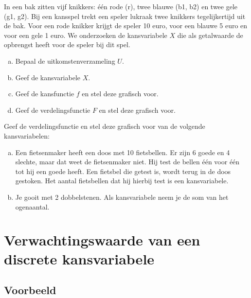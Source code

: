 \documentclass[a4paper,12pt, twoside]{article}
\begin{document}
\begin{oefening}
In een bak zitten vijf knikkers: één rode (r), twee blauwe (b1, b2) en twee gele (g1, g2). Bij een kansspel trekt een speler lukraak twee knikkers tegelijkertijd uit de bak. Voor een rode knikker krijgt de speler 10 euro, voor een blauwe 5 euro en voor een gele 1 euro.
We onderzoeken de kansvariabele $X$ die als getalwaarde de opbrengst heeft voor de speler bij dit spel.
\begin{enumerate}[(a)]
  \item Bepaal de uitkomstenverzameling $U$.
  \item Geef de kansvariabele $X$.
  \item Geef de kansfunctie $f$ en stel deze grafisch voor.
  \item Geef de verdelingsfunctie $F$ en stel deze grafisch voor.
\end{enumerate}
\end{oefening}

\begin{oefening}
Geef de verdelingsfunctie en stel deze grafisch voor van de volgende kansvariabelen:
\begin{enumerate}[(a)]
  \item Een fietsenmaker heeft een doos met 10 fietsbellen. Er zijn 6 goede en 4 slechte, maar dat weet de fietsenmaker niet. Hij test de bellen één voor één tot hij een goede heeft. Een fietsbel die getest is, wordt terug in de doos gestoken. Het aantal fietsbellen dat hij hierbij test is een kansvariabele.
  \item Je gooit met 2 dobbelstenen. Als kansvariabele neem je de som van het ogenaantal.
\end{enumerate}
\end{oefening}

\pagebreak

\section{Verwachtingswaarde van een discrete kansvariabele}

\subsection{Voorbeeld}
\end{document}
